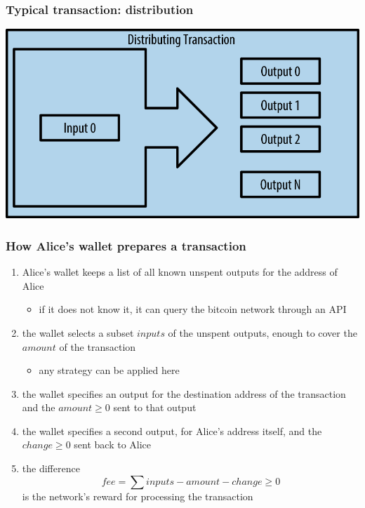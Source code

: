 \documentclass[11pt]{beamer}  %
\begin{document}
\begin{frame}\frametitle{Typical transaction: distribution}

  \begin{center}
    \includegraphics[scale=1.2,clip=false]{pictures/mbc2_0207.png}
  \end{center}

\end{frame}

\begin{frame}\frametitle{How Alice's wallet prepares a transaction}

  \begin{enumerate}
  \item Alice's wallet keeps a list of all known unspent outputs for the address
    of Alice
    \begin{itemize}
    \item if it does not know it, it can query the bitcoin network through an API
    \end{itemize}
  \item the wallet selects a subset $\mathit{inputs}$ of the unspent outputs, enough to cover
    the $\mathit{amount}$ of the transaction
    \begin{itemize}
    \item any strategy can be applied here
    \end{itemize}
  \item the wallet specifies an output for the destination address of the transaction
    and the $\mathit{amount}\ge 0$ sent to that output
  \item the wallet specifies a second output, for Alice's address itself, and the
    $\mathit{change}\ge 0$ sent back to Alice
  \item the difference
    \[
    \mathit{fee}=\sum\mathit{inputs}-\mathit{amount}-\mathit{change}\ge 0
    \]
    is the network's reward for processing the transaction
  \end{enumerate}

\end{frame}
\end{document}
